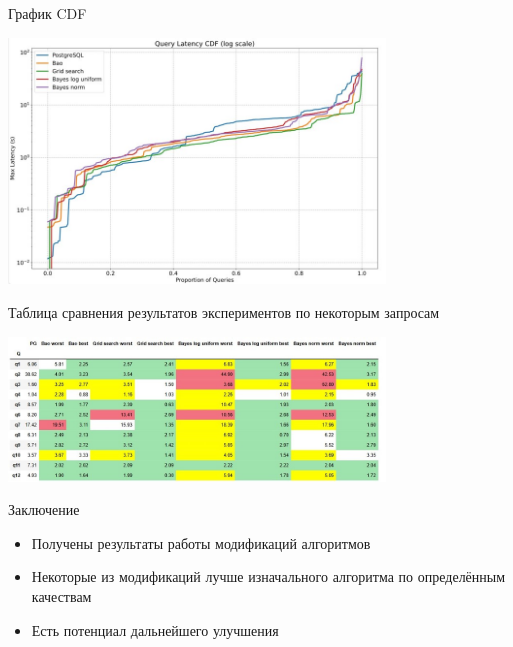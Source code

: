 \documentclass{beamer}
\begin{document}
\begin{frame}{График CDF}
\begin{center}
\includegraphics[width=10cm]{cdf.jpg}
\end{center}
\end{frame}
\begin{frame}{Таблица сравнения результатов экспериментов по некоторым запросам}
\begin{center}
\includegraphics[width=10cm]{table.jpg}
\end{center}
\end{frame}

\begin{frame}{Заключение}
  \begin{itemize}
      \item Получены результаты работы модификаций алгоритмов
      \item Некоторые из модификаций лучше изначального алгоритма по определённым качествам
      \item Есть потенциал дальнейшего улучшения
  \end{itemize}
\end{frame}
\end{document}
